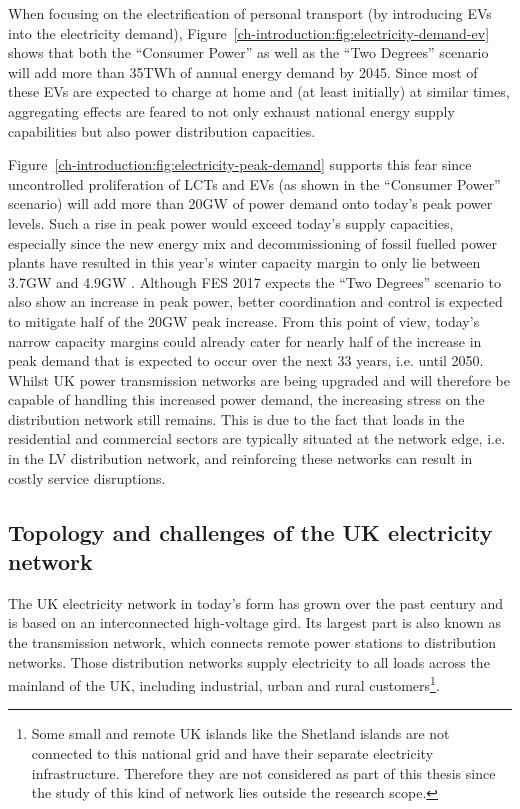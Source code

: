 

When focusing on the electrification of personal transport (by introducing EVs into the electricity demand), Figure~\ref{ch-introduction:fig:electricity-demand-ev} shows that both the ``Consumer Power'' as well as the ``Two Degrees'' scenario will add more than 35TWh of annual energy demand by 2045.
Since most of these EVs are expected to charge at home and (at least initially) at similar times, aggregating effects are feared to not only exhaust national energy supply capabilities but also power distribution capacities.




Figure~\ref{ch-introduction:fig:electricity-peak-demand} supports this fear since uncontrolled proliferation of LCTs and EVs (as shown in the ``Consumer Power'' scenario) will add more than 20GW of power demand onto today's peak power levels.
Such a rise in peak power would exceed today's supply capacities, especially since the new energy mix and decommissioning of fossil fuelled power plants have resulted in this year's winter capacity margin to only lie between 3.7GW and 4.9GW \cite{NationalGrid2017a}.
Although FES 2017 expects the ``Two Degrees'' scenario to also show an increase in peak power, better coordination and control is expected to mitigate half of the 20GW peak increase.
From this point of view, today's narrow capacity margins could already cater for nearly half of the increase in peak demand that is expected to occur over the next 33 years, i.e. until 2050.
Whilst UK power transmission networks are being upgraded and will therefore be capable of handling this increased power demand, the increasing stress on the distribution network still remains.
This is due to the fact that loads in the residential and commercial sectors are typically situated at the network edge, i.e. in the LV distribution network, and reinforcing these networks can result in costly service disruptions.

\subsection{Topology and challenges of the UK electricity network}
\label{ch-introduction:subsec:topology-of-lv-network}

The UK electricity network in today's form has grown over the past century and is based on an interconnected high-voltage gird.
Its largest part is also known as the transmission network, which connects remote power stations to distribution networks.
Those distribution networks supply electricity to all loads across the mainland of the UK, including industrial, urban and rural customers\footnote{Some small and remote UK islands like the Shetland islands are not connected to this national grid and have their separate electricity infrastructure. Therefore they are not considered as part of this thesis since the study of this kind of network lies outside the research scope.}.

